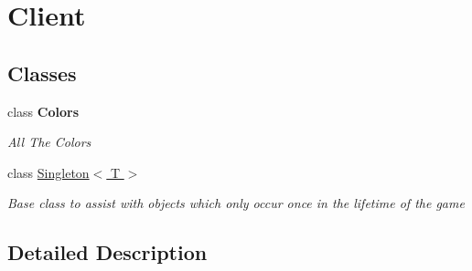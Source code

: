 \hypertarget{group__client}{\section{Client}
\label{group__client}
}
\subsection*{Classes}
\begin{DoxyCompactItemize}
\item 
class {\bfseries Colors}
\begin{DoxyCompactList}\small\item\em All The Colors \end{DoxyCompactList}\item 
class \hyperlink{class_singleton_3_01_t_01_4}{Singleton$<$ T $>$}
\begin{DoxyCompactList}\small\item\em Base class to assist with objects which only occur once in the lifetime of the game \end{DoxyCompactList}\end{DoxyCompactItemize}


\subsection{Detailed Description}
